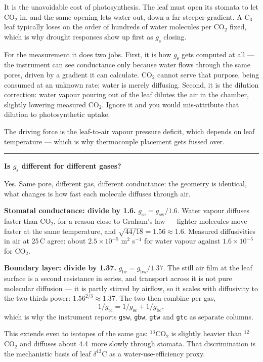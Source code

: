 \documentclass[11pt,letterpaper]{article}
\newcommand{\question}[1]{%
  \vspace{1.5em}%
  {\noindent\color{rulegray}\rule{\textwidth}{0.4pt}\par}%
  \vspace{0.7em}%
  {\noindent\color{accent}\bfseries #1\par}%
  \vspace{0.6em}%
}
\begin{document}
It is the unavoidable cost of photosynthesis. The leaf must open its stomata to
let CO$_2$ in, and the same opening lets water out, down a far steeper gradient.
A C$_3$ leaf typically loses on the order of hundreds of water molecules per
CO$_2$ fixed, which is why drought responses show up first as $g_{\mathrm{s}}$
closing.

For the measurement it does two jobs. First, it is how $g_{\mathrm{s}}$ gets
computed at all --- the instrument can see conductance only because water flows
through the same pores, driven by a gradient it can calculate. CO$_2$ cannot
serve that purpose, being consumed at an unknown rate; water is merely
diffusing. Second, it is the dilution correction: water vapour pouring out of
the leaf dilutes the air in the chamber, slightly lowering measured CO$_2$.
Ignore it and you would mis-attribute that dilution to photosynthetic uptake.

The driving force is the leaf-to-air vapour pressure deficit, which depends on
leaf temperature --- which is why thermocouple placement gets fussed over.

\question{Is $g_{\mathrm{s}}$ different for different gases?}

Yes. Same pore, different gas, different conductance: the geometry is identical,
what changes is how fast each molecule diffuses through air.

\textbf{Stomatal conductance: divide by 1.6.}
$g_{\mathrm{sc}} = g_{\mathrm{sw}}/1.6$. Water vapour diffuses faster than
CO$_2$, for a reason close to Graham's law --- lighter molecules move faster at
the same temperature, and $\sqrt{44/18} = 1.56 \approx 1.6$. Measured
diffusivities in air at 25\,\textdegree C agree: about $2.5 \times 10^{-5}$
m$^2$ s$^{-1}$ for water vapour against $1.6 \times 10^{-5}$ for CO$_2$.

\textbf{Boundary layer: divide by 1.37.}
$g_{\mathrm{bc}} = g_{\mathrm{bw}}/1.37$. The still air film at the leaf surface
is a second resistance in series, and transport across it is not pure molecular
diffusion --- it is partly stirred by airflow, so it scales with diffusivity to
the two-thirds power: $1.56^{2/3} \approx 1.37$. The two then combine per gas,
\[
1/g_{\mathrm{tc}} = 1/g_{\mathrm{sc}} + 1/g_{\mathrm{bc}},
\]
which is why the instrument reports \texttt{gsw}, \texttt{gbw}, \texttt{gtw} and
\texttt{gtc} as separate columns.

This extends even to isotopes of the same gas: $^{13}$CO$_2$ is slightly heavier
than $^{12}$CO$_2$ and diffuses about 4.4\,\textperthousand{} more slowly
through stomata. That discrimination is the mechanistic basis of leaf
$\delta^{13}$C as a water-use-efficiency proxy.
\end{document}
